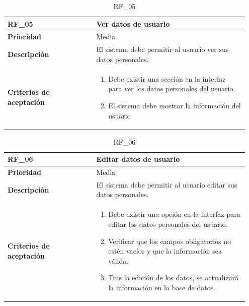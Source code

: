 \begin{table}[htb!]
    \begin{tabular}{|p{0.35\linewidth}|p{0.6\linewidth}|}
        \hline
        \rowcolor[HTML]{C0C0C0}  
        \textbf{RF\_05} & \textbf{Ver datos de usuario} \\
        \hline
        \textbf{Prioridad} & Media \\
        \hline
        \textbf{Descripción} & El sistema debe permitir al usuario ver sus datos personales.  \\
        \hline
        \vspace{0.5mm}
        \textbf{Criterios de aceptación} & 
        \begin{minipage}[t]{0.9\linewidth}
            \begin{enumerate}
                \item Debe existir una sección en la interfaz para ver los datos personales del usuario.
                \item El sistema debe mostrar la información del usuario
            \end{enumerate}
            \vspace{2mm}
        \end{minipage} \\
        \hline
    \end{tabular}
    \caption{RF\_05}
    \label{req:RF05}
\end{table}

\begin{table}[htb!]
    \begin{tabular}{|p{0.35\linewidth}|p{0.6\linewidth}|}
        \hline
        \rowcolor[HTML]{C0C0C0}  
        \textbf{RF\_06} & \textbf{Editar datos de usuario} \\
        \hline
        \textbf{Prioridad} & Media \\
        \hline
        \textbf{Descripción} & El sistema debe permitir al usuario editar sus datos personales.  \\
        \hline
        \vspace{0.5mm}
        \textbf{Criterios de aceptación} & 
        \begin{minipage}[t]{0.9\linewidth}
            \begin{enumerate}
                \item Debe existir una opción en la interfaz para editar los datos personales del usuario.
                \item Verificar que los campos obligatorios no estén vacíos y que la información sea válida.
                \item Tras la edición de los datos, se actualizará la información en la base de datos.
            \end{enumerate}
            \vspace{2mm}
        \end{minipage} \\
        \hline
    \end{tabular}
    \label{req:RF06}
    \caption{RF\_06}
\end{table}

